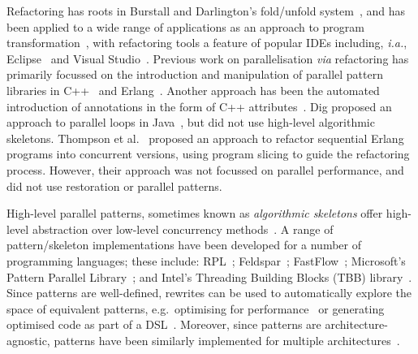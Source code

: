 Refactoring has roots in Burstall and Darlington's fold/unfold system~\cite{darlington77}, and has been applied to a wide range of applications as an approach to program transformation~\cite{mens_refactoring}, with refactoring tools a feature of popular IDEs including, \textit{i.a.}, Eclipse~\cite{EclipseWeb} and Visual Studio~\cite{VisualStudioWeb}.
Previous work on parallelisation \textit{via} refactoring has primarily focussed on the introduction and manipulation of parallel pattern libraries in C++~\cite{brownagricultural,DBLP:conf/pdp/JanjicBMHDAG16} and Erlang~\cite{hlpp,DBLP:journals/cai/BarwellBHTB16}. Another approach
has been the automated introduction of annotations in the form of
C++ attributes~\cite{rio:2018}. Dig proposed an approach to parallel loops in Java~\cite{dig}, but did not use high-level algorithmic skeletons. Thompson et al.~\cite{10.1145/2678015.2682533} proposed an approach to refactor sequential Erlang programs into concurrent versions, using program slicing to guide the refactoring process. However, their approach was not focussed on parallel performance, and did not use restoration or parallel patterns.  

High-level parallel patterns, sometimes known as \emph{algorithmic skeletons} offer high-level abstraction over low-level concurrency methods~\cite{Asanovic:2009:VPC,DBLP:journals/spe/Gonzalez-VelezL10}.
A range of pattern/skeleton implementations have been developed for a number of programming languages; these include: RPL~\cite{DBLP:conf/pdp/JanjicBMHDAG16}; Feldspar~\cite{DBLP:conf/ifl/AxelssonCSSEP10}; FastFlow~\cite{DBLP:journals/mis/JinLWY15}; Microsoft's Pattern Parallel Library~\cite{ACM:book/msoft/CampbellM11}; and Intel's Threading Building Blocks (TBB) library~\cite{DBLP:reference/parallel/X11pz}.
Since patterns are well-defined, rewrites can be used to automatically explore the space of equivalent patterns, e.g.\ optimising for performance~\cite{DBLP:conf/europar/MatsuzakiKIHA04,DBLP:conf/ipps/GorlatchWL99} or generating optimised code as part of a DSL~\cite{DBLP:conf/dagstuhl/Gorlatch03}. Moreover, since patterns are architecture-agnostic, patterns have been similarly implemented for multiple architectures~\cite{DBLP:conf/cgo/HagedornSSGD18,DBLP:conf/parco/ReyesL15}.

